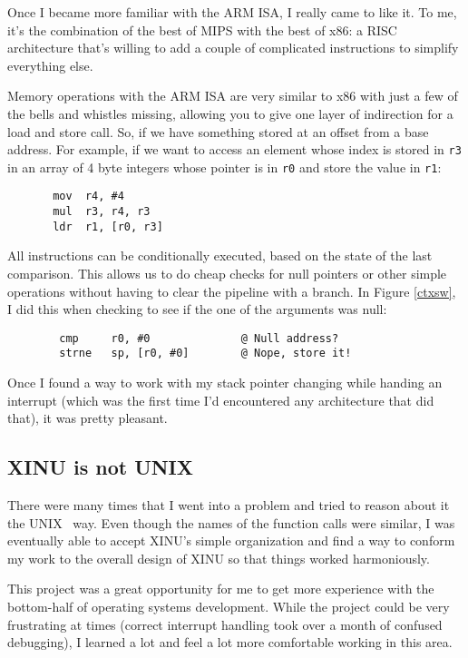 \documentclass[12pt]{article}
\newcommand{\code}[1]{{\tt #1}}
\newcommand{\unix}[0]{U{\small NIX}}
\begin{document}
Once I became more familiar with the ARM ISA, I really came to like it. To me,
it's the combination of the best of MIPS with the best of x86: a RISC
architecture that's willing to add a couple of complicated instructions to
simplify everything else.

Memory operations with the ARM ISA are very similar to x86 with just a few of
the bells and whistles missing, allowing you to give one layer of indirection
for a load and store call. So, if we have something stored at an offset from a
base address. For example, if we want to access an element whose index is
stored in \code{r3} in an array of 4 byte integers whose pointer is in
\code{r0} and store the value in \code{r1}:

\begin{verbatim}
       mov  r4, #4
       mul  r3, r4, r3
       ldr  r1, [r0, r3]
\end{verbatim}

All instructions can be conditionally executed, based on the state of the last
comparison. This allows us to do cheap checks for null pointers or other simple
operations without having to clear the pipeline with a branch. In Figure
\ref{ctxsw}, I did this when checking to see if the one of the arguments was
null:

\begin{verbatim}
        cmp     r0, #0              @ Null address?
        strne   sp, [r0, #0]        @ Nope, store it!
\end{verbatim}

Once I found a way to work with my stack pointer changing while handing an
interrupt (which was the first time I'd encountered any architecture that did
that), it was pretty pleasant.

\subsection{XINU is not \unix}

There were many times that I went into a problem and tried to reason about it
the \unix~ way. Even though the names of the function calls were similar, I was
eventually able to accept XINU's simple organization and find a way to conform
my work to the overall design of XINU so that things worked harmoniously.

This project was a great opportunity for me to get more experience with the
bottom-half of operating systems development. While the project could be very
frustrating at times (correct interrupt handling took over a month of confused
debugging), I learned a lot and feel a lot more comfortable working in this
area.
\end{document}
